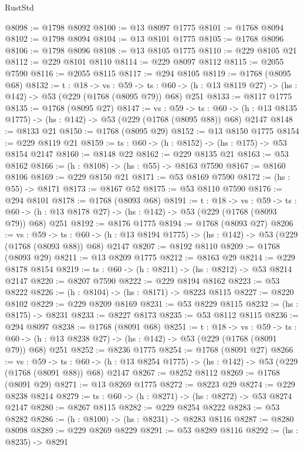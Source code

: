 \begin{lexlean}{RustStd}
\begin{coremodule}
@8098 := @1798 @8092
@8100 := @13 @8097 @1775
@8101 := @1768 @8094
@8102 := @1798 @8094
@8104 := @13 @8101 @1775
@8105 := @1768 @8096
@8106 := @1798 @8096
@8108 := @13 @8105 @1775
@8110 := @229 @8105 @21
@8112 := @229 @8101 @8110
@8114 := @229 @8097 @8112
@8115 := @2055 @7590
@8116 := @2055 @8115
@8117 := @294 @8105
@8119 := @1768 (@8095 @68)
@8132 := {t : @18} ->
  {vs : @59} ->
  {ts : @60} -> (h : @13 @8119 @27) -> (hs : @142) -> @53 (@229 (@1768 (@8095 @79)) @68) @251
@8133 := @8117 @1775
@8135 := @1768 (@8095 @27)
@8147 := {vs : @59} ->
  {ts : @60} -> (h : @13 @8135 @1775) -> (hs : @142) -> @53 (@229 (@1768 (@8095 @88)) @68) @2147
@8148 := @8133 @21
@8150 := @1768 (@8095 @29)
@8152 := @13 @8150 @1775
@8154 := @229 @8119 @21
@8159 := {ts : @60} -> (h : @8152) -> (hs : @175) -> @53 @8154 @2147
@8160 := @8148 @22
@8162 := @229 @8135 @21
@8163 := @53 @8162
@8166 := (h : @8108) -> (hs : @55) -> @8163 @7590
@8167 := @8160 @8106
@8169 := @229 @8150 @21
@8171 := @53 @8169 @7590
@8172 := (hs : @55) -> @8171
@8173 := @8167 @52
@8175 := @53 @8110 @7590
@8176 := @294 @8101
@8178 := @1768 (@8093 @68)
@8191 := {t : @18} ->
  {vs : @59} ->
  {ts : @60} -> (h : @13 @8178 @27) -> (hs : @142) -> @53 (@229 (@1768 (@8093 @79)) @68) @251
@8192 := @8176 @1775
@8194 := @1768 (@8093 @27)
@8206 := {vs : @59} ->
  {ts : @60} -> (h : @13 @8194 @1775) -> (hs : @142) -> @53 (@229 (@1768 (@8093 @88)) @68) @2147
@8207 := @8192 @8110
@8209 := @1768 (@8093 @29)
@8211 := @13 @8209 @1775
@8212 := @8163 @29
@8214 := @229 @8178 @8154
@8219 := {ts : @60} -> (h : @8211) -> (hs : @8212) -> @53 @8214 @2147
@8220 := @8207 @7590
@8222 := @229 @8194 @8162
@8223 := @53 @8222
@8226 := (h : @8104) -> (hs : @8171) -> @8223 @8115
@8227 := @8220 @8102
@8229 := @229 @8209 @8169
@8231 := @53 @8229 @8115
@8232 := (hs : @8175) -> @8231
@8233 := @8227 @8173
@8235 := @53 @8112 @8115
@8236 := @294 @8097
@8238 := @1768 (@8091 @68)
@8251 := {t : @18} ->
  {vs : @59} ->
  {ts : @60} -> (h : @13 @8238 @27) -> (hs : @142) -> @53 (@229 (@1768 (@8091 @79)) @68) @251
@8252 := @8236 @1775
@8254 := @1768 (@8091 @27)
@8266 := {vs : @59} ->
  {ts : @60} -> (h : @13 @8254 @1775) -> (hs : @142) -> @53 (@229 (@1768 (@8091 @88)) @68) @2147
@8267 := @8252 @8112
@8269 := @1768 (@8091 @29)
@8271 := @13 @8269 @1775
@8272 := @8223 @29
@8274 := @229 @8238 @8214
@8279 := {ts : @60} -> (h : @8271) -> (hs : @8272) -> @53 @8274 @2147
@8280 := @8267 @8115
@8282 := @229 @8254 @8222
@8283 := @53 @8282
@8286 := (h : @8100) -> (hs : @8231) -> @8283 @8116
@8287 := @8280 @8098
@8289 := @229 @8269 @8229
@8291 := @53 @8289 @8116
@8292 := (hs : @8235) -> @8291

\end{coremodule}
\end{lexlean}
